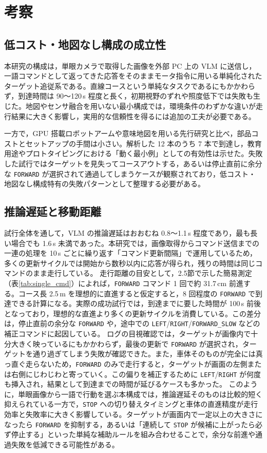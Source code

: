 \documentclass[a4paper,11pt]{ltjsreport}
\begin{document}
\chapter{考察}
\label{chap:discussion}
\section{低コスト・地図なし構成の成立性}
本研究の構成は，単眼カメラで取得した画像を外部 PC 上の VLM に送信し，一語コマンドとして返ってきた応答をそのままモータ指令に用いる単純化されたターゲット追従系である。直線コースという単純なタスクであるにもかかわらず，到達時間は 90〜120\,s 程度と長く，初期視野のずれや照度低下では失敗も生じた。地図やセンサ融合を用いない最小構成では，環境条件のわずかな違いが走行結果に大きく影響し，実用的な信頼性を得るには追加の工夫が必要である。

一方で，GPU 搭載ロボットアームや意味地図を用いる先行研究と比べ，部品コストとセットアップの手間は小さい。解析した 12 本のうち 7 本で到達し，教育用途やプロトタイピングにおける「動く最小例」としての有効性は示せた。失敗した試行ではターゲットを見失ってコースアウトする，あるいは停止直前に余分な \texttt{FORWARD} が選択されて通過してしまうケースが観察されており，低コスト・地図なし構成特有の失敗パターンとして整理する必要がある。

\section{推論遅延と移動距離}
試行全体を通して，VLM の推論遅延はおおむね 0.8〜1.1\,s 程度であり，最も長い場合でも 1.6\,s 未満であった。本研究では，画像取得からコマンド送信までの一連の処理を 10\,s ごとに繰り返す「コマンド更新間隔」で運用しているため，多くの更新サイクルでは開始から数秒以内に応答が得られ，残りの時間は同じコマンドのまま走行している。
走行距離の目安として，2.5節で示した簡易測定（表\ref{tab:single_cmd}）によれば，\texttt{FORWARD} コマンド 1 回で約 31.7\,cm 前進する。コース長 2.5\,m を理想的に直進すると仮定すると，8 回程度の \texttt{FORWARD} で到達できる計算になる。実際の成功試行では，到達までに要した時間が 100\,s 前後となっており，理想的な直進より多くの更新サイクルを消費している。この差分は，停止直前の余分な \texttt{FORWARD} や，途中での \texttt{LEFT}/\texttt{RIGHT}/\texttt{FORWARD\_SLOW} などの補正コマンドに起因している。
ログの目視確認では，ターゲットが画像内で十分大きく映っているにもかかわらず，最後の更新で \texttt{FORWARD} が選択され，ターゲットを通り過ぎてしまう失敗が確認できた。また，車体そのものが完全には真っ直ぐ走らないため，\texttt{FORWARD} のみで走行すると，ターゲットが画面の左側または右側にじわじわと寄っていく。この偏りを補正するために \texttt{LEFT}/\texttt{RIGHT} が何度も挿入され，結果として到達までの時間が延びるケースも多かった。
このように，単眼画像から一語で行動を選ぶ本構成では，推論遅延そのものは比較的短く抑えられている一方で，\texttt{STOP} への切り替えタイミングと車体の直進精度が走行効率と失敗率に大きく影響している。ターゲットが画面内で一定以上の大きさになったら \texttt{FORWARD} を抑制する，あるいは「連続して \texttt{STOP} が候補に上がったら必ず停止する」といった単純な補助ルールを組み合わせることで，余分な前進や通過失敗を低減できる可能性がある。
\end{document}

